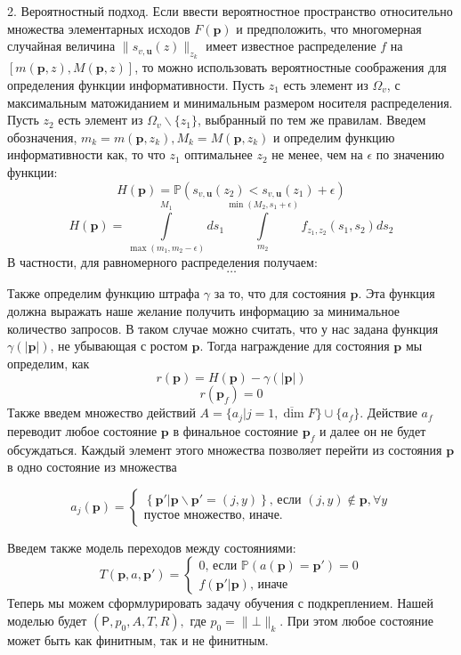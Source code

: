 \documentclass[12pt]{article}
\begin{document}
2. Вероятностный подход. Если ввести вероятностное пространство относительно множества элементарных исходов $F(\textbf{p})$ и предположить, что многомерная случайная величина $\|s_{v, \textbf{u}}(z)\|_{z_k}$ имеет известное распределение $f$ на $[m(\textbf{p},z), M(\textbf{p},z)]$, то можно использовать вероятностные соображения для определения функции информативности. Пусть $z_1$ есть элемент из $\Omega_v$, с максимальным матожиданием и минимальным размером носителя распределения. Пусть $z_2$ есть элемент из $\Omega_v\backslash \{z_1\}$, выбранный по тем же правилам. Введем обозначения, $m_k = m(\textbf{p}, z_k), M_k = M(\textbf{p}, z_k)$ и определим функцию информативности как, то что $z_1$ оптимальнее $z_2$ не менее, чем на $\epsilon$ по значению функции:
$$H(\textbf{p})=\mathbb{P}\left(s_{v, \textbf{u}}(z_2) < s_{v, \textbf{u}}(z_1) + \epsilon\right)$$
$$H(\textbf{p})=\int\limits_{\max(m_1, m_2-\epsilon)}^{M_1}ds_1 \int\limits_{m_2}^{\min(M_2, s_1+\epsilon)}f_{z_1, z_2}(s_1, s_2) ds_2$$
В частности, для равномерного распределения получаем:
$$\dots$$

Также определим функцию штрафа $\gamma$ за то, что  для состояния $\mathbf{p}$. Эта функция должна выражать наше желание получить информацию за минимальное количество запросов. В таком случае можно считать, что у нас задана функция $\gamma(|\mathbf{p}|)$, не убывающая с ростом $\textbf{p}$. Тогда награждение для состояния $\mathbf{p}$ мы определим, как
$$r(\mathbf{p}) = H(\mathbf{p}) - \gamma(|\mathbf{p}|)$$
$$r(\mathbf{p}_f) = 0$$
Также введем множество действий $A=\{a_j|j=\overline{1,\dim F}\}\cup\{a_f\}$. Действие $a_f$ переводит любое состояние $\mathbf{p}$ в финальное состояние $\mathbf{p}_f$ и далее он не будет обсуждаться. Каждый элемент этого множества позволяет перейти из состояния $\mathbf{p}$ в одно состояние из множества

\begin{equation}
a_j(\mathbf{p})=
\begin{cases}
\left\{\mathbf{p}'\Big|\mathbf{p}\backslash \mathbf{p}' = (j, y)\right\} \text{, если $(j,y) \notin \mathbf{p}, \forall y$} \\
\text{пустое множество, иначе.}
\end{cases}
\end{equation}

Введем также модель переходов между состояниями:
\begin{equation}
T(\mathbf{p}, a, \mathbf{p}') = 
\begin{cases}
0\text{, если $\mathbb{P}(a(\mathbf{p}) = \mathbf{p}') = 0$}\\
f(\mathbf{p}'|\mathbf{p})\text{, иначе}
\end{cases}
\end{equation}
Теперь мы можем сформлурировать задачу обучения с подкреплением. Нашей моделью будет $(\mathsf{P}, p_0, A, T, R),$ где $p_0 = \|\bot\|_k$. При этом любое состояние может быть как финитным, так и не финитным.
\end{document}
